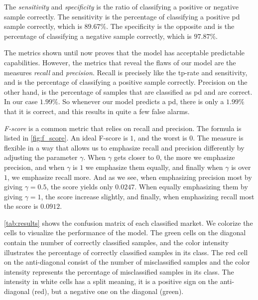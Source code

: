 The \emph{sensitivity} and \emph{specificity} is the ratio of classifying a positive or negative sample correctly. The sensitivity is the percentage of classifying a positive \ac{pd} sample correctly, which is $89.67\%$. The specificity is the opposite and is the percentage of classifying a negative sample correctly, which is $97.87\%$.

The metrics shown until now proves that the model has acceptable predictable capabilities. However, the metrics that reveal the flaws of our model are the measures \emph{recall} and \emph{precision}. Recall is precisely like the tp-rate and sensitivity, and is the percentage of classifying a positive sample correctly. Precision on the other hand, is the percentage of samples that are classified as \ac{pd} and are correct. In our case $1.99\%$. So whenever our model predicts a \ac{pd}, there is only a $1.99\%$ that it is correct, and this results in quite a few false alarms.



\emph{F-score} is a common metric that relies on recall and precision. The formula is listed in \autoref{fig:f_score}. An ideal F-score is $1$, and the worst is $0$. The measure is flexible in a way that allows us to emphasize recall and precision differently by adjusting the parameter $\gamma$. When $\gamma$ gets closer to $0$, the more we emphasize precision, and when $\gamma$ is $1$ we emphasize them equally, and finally when $\gamma$ is over $1$, we emphasize recall more. And as we see, when emphasizing precision most by giving $\gamma=0.5$, the score yields only $0.0247$. When equally emphasizing them by giving $\gamma=1$, the score increase slightly, and finally, when emphasizing recall most the score is $0.0912$.

\autoref{tab:results} shows the confusion matrix of each classified market. We colorize the cells to visualize the performance of the model. The green cells on the diagonal contain the number of correctly classified samples, and the color intensity illustrates the percentage of correctly classified samples in its class. The red cell on the anti-diagonal consist of the number of misclassified samples and the color intensity represents the percentage of misclassified samples in its class. The intensity in white cells has a split meaning, it is a positive sign on the anti-diagonal (red), but a negative one on the diagonal (green).



